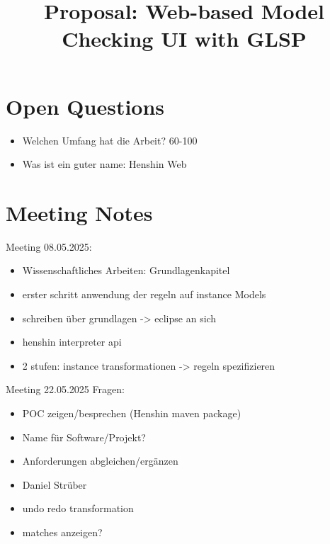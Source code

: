 \documentclass[conference,onecolumn]{IEEEtran}
\begin{document}
  \title{Proposal: Web-based Model Checking UI with GLSP}

  \author{
    }

  \maketitle

  \IEEEpeerreviewmaketitle

  \section{Open Questions}

  \begin{itemize}
    \item Welchen Umfang hat die Arbeit? 60-100
    \item Was ist ein guter name: Henshin Web
  \end{itemize}

  \section{Meeting Notes}

  Meeting 08.05.2025:
  \begin{itemize}
    \item Wissenschaftliches Arbeiten: Grundlagenkapitel
    \item erster schritt anwendung der regeln auf instance Models
    \item schreiben über grundlagen -> eclipse an sich
    \item henshin interpreter api
    \item 2 stufen: instance transformationen -> regeln spezifizieren
  \end{itemize}

  Meeting 22.05.2025 Fragen:
  \begin{itemize}
    \item POC zeigen/besprechen (Henshin maven package)
    \item Name für Software/Projekt?
    \item Anforderungen abgleichen/ergänzen
    \item Daniel Strüber
    \item undo redo transformation
    \item matches anzeigen?
  \end{itemize}
\end{document}
